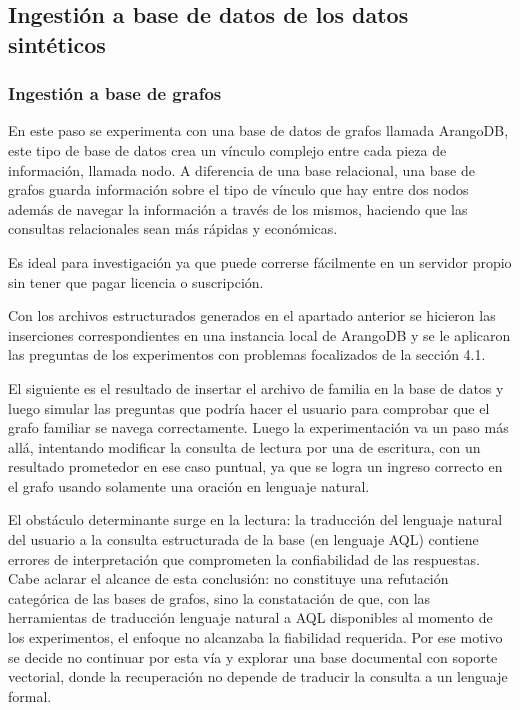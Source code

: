 \subsection{Ingestión a base de datos de los datos sintéticos}

\subsubsection{Ingestión a base de grafos}

En este paso se experimenta con una base de datos de grafos llamada ArangoDB, este tipo de base de datos crea un vínculo complejo entre cada pieza de información, llamada nodo. A diferencia de una base relacional, una base de grafos guarda información sobre el tipo de vínculo que hay entre dos nodos además de navegar la información a través de los mismos, haciendo que las consultas relacionales sean más rápidas y económicas.

Es ideal para investigación ya que puede correrse fácilmente en un servidor propio sin tener que pagar licencia o suscripción.

Con los archivos estructurados generados en el apartado anterior se hicieron las inserciones correspondientes en una instancia local de ArangoDB y se le aplicaron las preguntas de los experimentos con problemas focalizados de la sección 4.1.

El siguiente es el resultado de insertar el archivo de familia en la base de datos y luego simular las preguntas que podría hacer el usuario para comprobar que el grafo familiar se navega correctamente. Luego la experimentación va un paso más allá, intentando modificar la consulta de lectura por una de escritura, con un resultado prometedor en ese caso puntual, ya que se logra un ingreso correcto en el grafo usando solamente una oración en lenguaje natural.

El obstáculo determinante surge en la lectura: la traducción del lenguaje natural del usuario a la consulta estructurada de la base (en lenguaje AQL) contiene errores de interpretación que comprometen la confiabilidad de las respuestas. Cabe aclarar el alcance de esta conclusión: no constituye una refutación categórica de las bases de grafos, sino la constatación de que, con las herramientas de traducción lenguaje natural a AQL disponibles al momento de los experimentos, el enfoque no alcanzaba la fiabilidad requerida. Por ese motivo se decide no continuar por esta vía y explorar una base documental con soporte vectorial, donde la recuperación no depende de traducir la consulta a un lenguaje formal.

